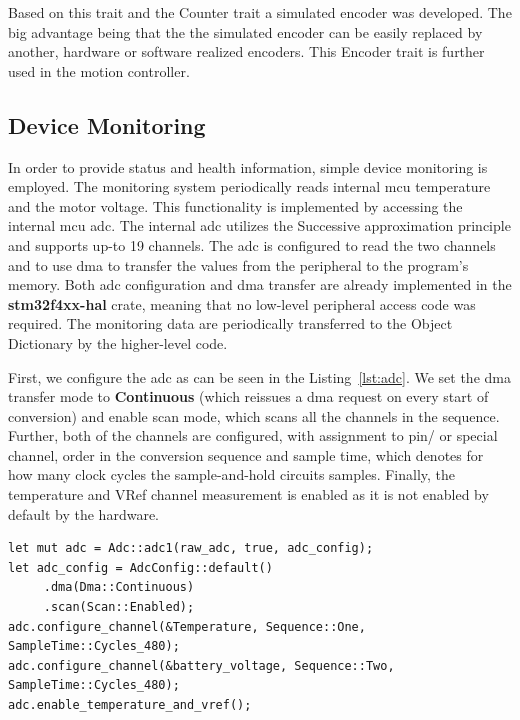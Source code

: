 Based on this trait and the Counter trait a simulated encoder was developed.
The big advantage being that the the simulated encoder can be easily replaced by another, hardware or software realized encoders.
This Encoder trait is further used in the motion controller.

\subsection{Device Monitoring}
\label{subsec:device_monitoring}
In order to provide status and health information, simple device monitoring is employed.
The monitoring system periodically reads internal \acs{mcu} temperature and the motor voltage.
This functionality is implemented by accessing the internal \acs{mcu} \acs{adc}.
The internal \acs{adc} utilizes the Successive approximation principle and supports up-to 19 channels\cite{stmicro_stm32f405xx_2020}.
The \acs{adc} is configured to read the two channels and to use \acs{dma} to transfer the values from the peripheral to the program's memory.
Both \acs{adc} configuration and \acs{dma} transfer are already implemented in the \textbf{stm32f4xx-hal} crate, meaning that no low-level peripheral access code was required.
The monitoring data are periodically transferred to the Object Dictionary by the higher-level code.

First, we configure the \acs{adc} as can be seen in the Listing~\ref{lst:adc}.
We set the \acs{dma} transfer mode to \textbf{Continuous} (which reissues a \acs{dma} request on every start of conversion) and enable scan mode, which scans all the channels in the sequence.
Further, both of the channels are configured, with assignment to pin/ or special channel, order in the conversion sequence and sample time, which denotes for how many clock cycles the sample-and-hold circuits samples.
Finally, the temperature and VRef channel measurement is enabled as it is not enabled by default by the hardware.

\begin{lstlisting}[caption={Configuring ADC for temperature and voltage monitoring.},label=lst:adc]
let mut adc = Adc::adc1(raw_adc, true, adc_config);
let adc_config = AdcConfig::default()
     .dma(Dma::Continuous)
     .scan(Scan::Enabled);
adc.configure_channel(&Temperature, Sequence::One, SampleTime::Cycles_480);
adc.configure_channel(&battery_voltage, Sequence::Two, SampleTime::Cycles_480);
adc.enable_temperature_and_vref();
\end{lstlisting}

